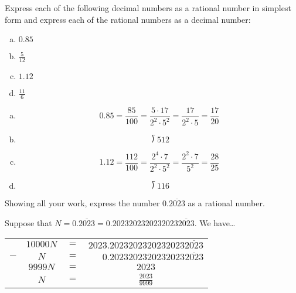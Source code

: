 \documentclass[11pt,letterpaper]{article}
\begin{document}

 Express each of the following decimal numbers as a rational number in simplest form and express each of the rational numbers as a decimal number:
	\begin{enumerate}[(a)]
	\item $0.85$
	\item $\frac{5}{12}$
	\item $1.12$
	\item $\frac{11}{6}$
	\end{enumerate} \pspace

\sol 
\begin{enumerate}[(a)]
\item 
	\[
	0.85= \dfrac{85}{100}= \dfrac{5 \cdot 17}{2^2 \cdot 5^2}= \dfrac{17}{2^2 \cdot 5}= \dfrac{17}{20}
	\] \pspace

\item 
	\[
	\longdivision{5}{12} %
	\] \pspace
 
\item 
	\[
	1.12= \dfrac{112}{100}= \dfrac{2^4 \cdot 7}{2^2 \cdot 5^2}= \dfrac{2^2 \cdot 7}{5^2}= \dfrac{28}{25}
	\] \pspace
 
\item 
	\[
	\longdivision{11}{6} %
	\]  
\end{enumerate}



\newpage



 Showing all your work, express the number $0.\overline{2023}$ as a rational number. \pspace

\sol Suppose that $N= 0.\overline{2023}= 0.2023202320232023\overline{2023}$. We have\dots
	\begin{table}[!ht]
	\centering\small
	\begin{tabular}{rccc}
	& $10000N$ & $=$ & $2023.2023202320232023\overline{2023}$ \\ 
	$-$ & $N$ & $=$ & $\phantom{202}0.2023202320232023\overline{2023}$ \\ \hline
	& $9999N$ & $=$ & $2023$ \\[0.1cm]
	& $N$ & $=$ & $\frac{2023}{9999}$
	\end{tabular}
	\end{table} \par
\end{document}
